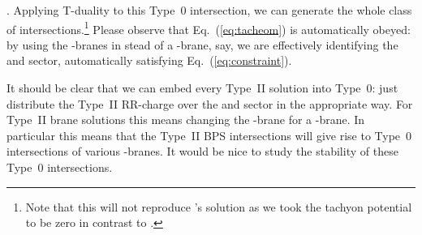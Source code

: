 \documentclass[12pt,a4paper]{article}
\begin{document}
\coordHE{}.  Applying T-duality to this Type~0 intersection, we can
generate the whole class of \coordHE{} intersections.\footnote{Note
  that this will not reproduce \cite{kn:costa}'s \coordHE{}
  solution as we took the tachyon potential to be zero in contrast to
  \cite{kn:costa}.}  Please observe that Eq.~(\ref{eq:tacheom}) is
automatically obeyed: by using the \coordHE{}-branes in stead of a
\coordHE{}-brane, say, we are effectively identifying the \myHighlight{$^{+}$}\coordHE{} and
\myHighlight{$^{-}$}\coordHE{} sector, automatically satisfying Eq.~(\ref{eq:constraint}).
\par
It should be clear that we can embed every Type~II solution into
Type~0: just distribute the Type~II RR-charge over the \myHighlight{$^{+}$}\coordHE{} and
\myHighlight{$^{-}$}\coordHE{} sector in the appropriate way.  {}For Type~II brane solutions
this means changing the \coordHE{}-brane for a \coordHE{}-brane.  In
particular this means that the Type~II BPS intersections will give
rise to Type~0 intersections of various \coordHE{}-branes.  It would
be nice to study the stability of these Type~0 intersections.
\end{document}
